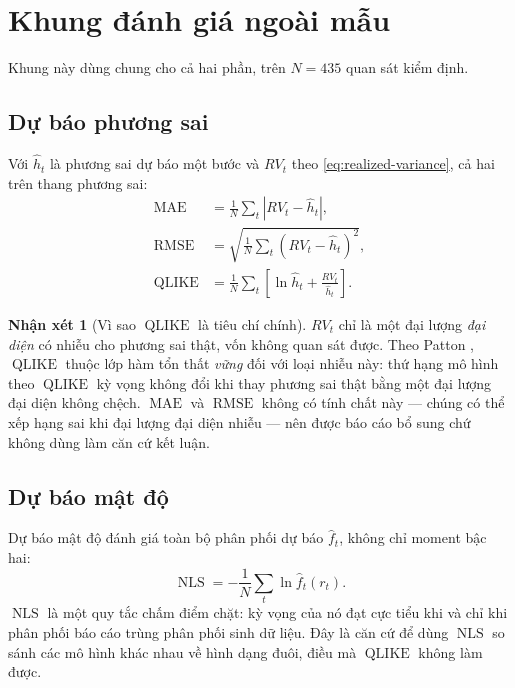 \documentclass[12pt,a4paper]{article}
\numberwithin{equation}{section}
\theoremstyle{definition}
\newtheorem{remark}{Nhận xét}[section]
\newcommand{\MAE}{\operatorname{MAE}}
\newcommand{\RMSE}{\operatorname{RMSE}}
\newcommand{\QLIKE}{\operatorname{QLIKE}}
\newcommand{\NLS}{\operatorname{NLS}}
\begin{document}
\section{Khung đánh giá ngoài mẫu}\label{sec:oos}

Khung này dùng chung cho cả hai phần, trên $N=435$ quan sát kiểm định.

\subsection{Dự báo phương sai}\label{subsec:vol-forecast}
Với $\widehat h_t$ là phương sai dự báo một bước và $RV_t$ theo
\eqref{eq:realized-variance}, cả hai trên thang phương sai:
\begin{align}
  \MAE &= \frac{1}{N}\sum_{t}\left|RV_t-\widehat h_t\right|,
  \label{eq:mae-vol}\\
  \RMSE &= \sqrt{\frac{1}{N}\sum_{t}\left(RV_t-\widehat h_t\right)^{2}},
  \label{eq:rmse-vol}\\
  \QLIKE &= \frac{1}{N}\sum_{t}\left[\ln\widehat h_t+\frac{RV_t}{\widehat h_t}\right].
  \label{eq:qlike}
\end{align}

\begin{remark}[Vì sao $\QLIKE$ là tiêu chí chính]\label{rem:qlike}
$RV_t$ chỉ là một đại lượng \emph{đại diện} có nhiễu cho phương sai thật, vốn không quan
sát được. Theo Patton \cite{patton2011}, $\QLIKE$ thuộc lớp hàm tổn thất \emph{vững} đối
với loại nhiễu này: thứ hạng mô hình theo $\QLIKE$ kỳ vọng không đổi khi thay phương sai
thật bằng một đại lượng đại diện không chệch. $\MAE$ và $\RMSE$ không có tính chất này ---
chúng có thể xếp hạng sai khi đại lượng đại diện nhiễu --- nên được báo cáo bổ sung chứ
không dùng làm căn cứ kết luận.
\end{remark}

\subsection{Dự báo mật độ}\label{subsec:density-forecast}
Dự báo mật độ đánh giá toàn bộ phân phối dự báo $\widehat f_t$, không chỉ moment bậc hai:
\begin{equation}
  \NLS=-\frac{1}{N}\sum_{t}\ln\widehat f_t(r_t).
  \label{eq:negative-log-score}
\end{equation}
$\NLS$ là một quy tắc chấm điểm chặt: kỳ vọng của nó đạt cực tiểu khi và chỉ khi phân
phối báo cáo trùng phân phối sinh dữ liệu. Đây là căn cứ để dùng $\NLS$ so sánh các mô
hình khác nhau về hình dạng đuôi, điều mà $\QLIKE$ không làm được.
\end{document}
